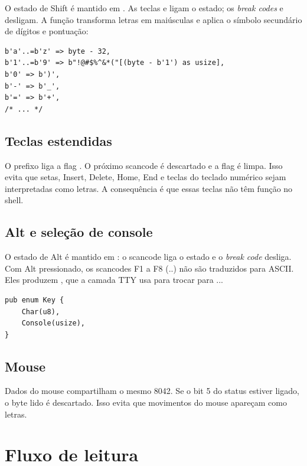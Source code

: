 O estado de Shift \'e mantido em . As teclas
 e  ligam o estado; os \emph{break codes} 
e  desligam. A fun\c{c}\~ao  transforma letras
em mai\'usculas e aplica o s\'imbolo secund\'ario de d\'igitos e pontua\c{c}\~ao:

\begin{lstlisting}[caption={Mapeamento com Shift.},label={lst:shift}]
b'a'..=b'z' => byte - 32,
b'1'..=b'9' => b"!@#$%^&*("[(byte - b'1') as usize],
b'0' => b')',
b'-' => b'_',
b'=' => b'+',
/* ... */
\end{lstlisting}

\subsection{Teclas estendidas}

O prefixo  liga a flag . O pr\'oximo scancode \'e
descartado e a flag \'e limpa. Isso evita que setas, Insert, Delete, Home,
End e teclas do teclado num\'erico sejam interpretadas como letras. A
consequ\^encia \'e que essas teclas n\~ao t\^em fun\c{c}\~ao no shell.

\subsection{Alt e sele\c{c}\~ao de console}

O estado de Alt \'e mantido em : o scancode
 liga o estado e o \emph{break code}  desliga. Com Alt
pressionado, os scancodes F1 a F8 (..) n\~ao s\~ao
traduzidos para ASCII. Eles produzem , que a camada
TTY usa para trocar para ...

\begin{lstlisting}[caption={Resultado do driver de teclado.},label={lst:key}]
pub enum Key {
    Char(u8),
    Console(usize),
}
\end{lstlisting}

\subsection{Mouse}

Dados do mouse compartilham o mesmo 8042. Se o bit 5 do status estiver
ligado, o byte lido \'e descartado. Isso evita que movimentos do mouse
apare\c{c}am como letras.

\section{Fluxo de leitura}

